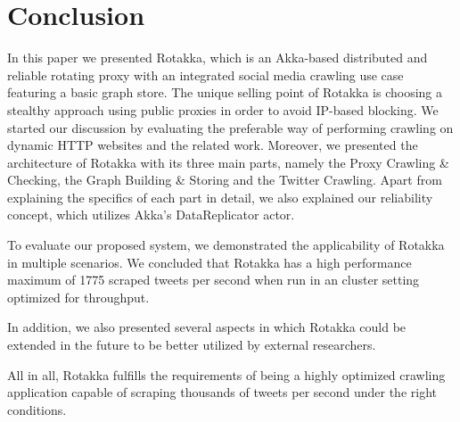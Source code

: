 \documentclass{sigchi}
\begin{document}
\section{Conclusion}

In this paper we presented Rotakka, which is an Akka-based distributed and reliable rotating proxy with an integrated social media crawling use case featuring a basic graph store. The unique selling point of Rotakka is choosing a stealthy approach using public proxies in order to avoid IP-based blocking. We started our discussion by evaluating the preferable way of performing crawling on dynamic HTTP websites and the related work. Moreover, we presented the architecture of Rotakka with its three main parts, namely the Proxy Crawling \& Checking, the Graph Building \& Storing and the Twitter Crawling. Apart from explaining the specifics of each part in detail, we also explained our reliability concept, which utilizes Akka's DataReplicator actor.

To evaluate our proposed system, we demonstrated the applicability of Rotakka in multiple scenarios. We concluded that Rotakka has a high performance maximum of 1775 scraped tweets per second when run in an cluster setting optimized for throughput.

In addition, we also presented several aspects in which Rotakka could be extended in the future to be better utilized by external researchers.

All in all, Rotakka fulfills the requirements of being a highly optimized crawling application capable of scraping thousands of tweets per second under the right conditions.

\balance{}



\end{document}
